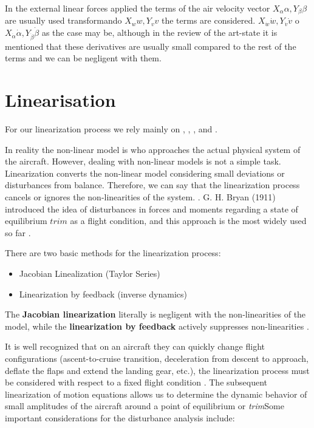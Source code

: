 In the external linear forces applied the terms of the air velocity vector $X_{\alpha} \alpha, Y_{\beta} \beta$ are usually used transformando $ X_{w} w, Y_{v} v$ the terms are considered. $ X_{\dot w} \dot w, Y_{\dot v} \dot v$ o $ X_{\dot \alpha} \dot \alpha, Y_{\dot \beta} \dot \beta$ as the case may be, although in the review of the art-state it is mentioned that these derivatives are usually small compared to the rest of the terms and we can be negligent with them. 



\section{Linearisation}
\label{linealizacion a}
For our linearization process we rely mainly on \cite{Etkin1996}, \cite{Lewis2016}, \cite{Schimdt1998}, \cite{USAF1988} and \cite{Mohammad2020}. 


In reality the non-linear model is who approaches the actual physical system of the aircraft. However, dealing with non-linear models is not a simple task. Linearization converts the non-linear model considering small deviations or disturbances from balance. Therefore, we can say that the linearization process cancels or ignores the non-linearities of the system. \cite{Mohammad2020}. G. H. Bryan (1911) introduced the idea of disturbances in forces and moments regarding a state of equilibrium $trim$ as a flight condition, and this approach is the most widely used so far \cite{Cook2007}. 


There are two basic methods for the linearization process: 
\begin{itemize}
    \item Jacobian Linealization (Taylor Series)
    \item Linearization by feedback (inverse dynamics)
\end{itemize}

The \textbf{Jacobian linearization} literally is negligent with the non-linearities of the model, while the \textbf{linearization by feedback} actively suppresses non-linearities \cite{Mohammad2020}.

It is well recognized that on an aircraft they can quickly change flight configurations (ascent-to-cruise transition, deceleration from descent to approach, deflate the \textit{}{flaps} and extend the landing gear, etc.), the linearization process must be considered with respect to a fixed flight condition \cite{Schimdt1998}. The subsequent linearization of motion equations allows us to determine the dynamic behavior of small amplitudes of the aircraft around a point of equilibrium or \textit{trim}Some important considerations for the disturbance analysis include:

